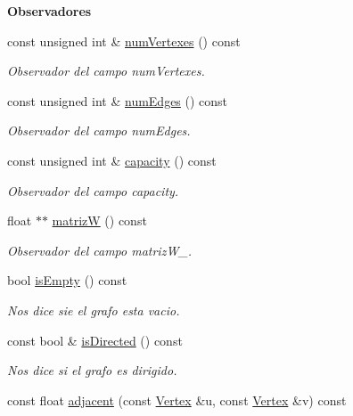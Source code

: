 \begin{Indent}{\bf Observadores}\par
\begin{DoxyCompactItemize}
\item 
const unsigned int \& \hyperlink{classedi_1_1GraphMatrix_ada3e3accdfeb7dc48482560cc2842f59}{num\+Vertexes} () const 
\begin{DoxyCompactList}\small\item\em Observador del campo num\+Vertexes. \end{DoxyCompactList}\item 
const unsigned int \& \hyperlink{classedi_1_1GraphMatrix_a4f5efb372ff3e02a42f2b77ba2932b04}{num\+Edges} () const 
\begin{DoxyCompactList}\small\item\em Observador del campo num\+Edges. \end{DoxyCompactList}\item 
const unsigned int \& \hyperlink{classedi_1_1GraphMatrix_afbcaf9d1a05c4ae921325641148c0a63}{capacity} () const 
\begin{DoxyCompactList}\small\item\em Observador del campo capacity. \end{DoxyCompactList}\item 
float $\ast$$\ast$ \hyperlink{classedi_1_1GraphMatrix_a93459a3fa6e67b66391036d6f608e5c9}{matriz\+W} () const 
\begin{DoxyCompactList}\small\item\em Observador del campo matriz\+W\+\_\+. \end{DoxyCompactList}\item 
bool \hyperlink{classedi_1_1GraphMatrix_aada33cb444bf07048b782c0ed3915600}{is\+Empty} () const 
\begin{DoxyCompactList}\small\item\em Nos dice sie el grafo esta vacio. \end{DoxyCompactList}\item 
const bool \& \hyperlink{classedi_1_1GraphMatrix_ac9ecf45464596cc29ee2e70ce8342c4c}{is\+Directed} () const 
\begin{DoxyCompactList}\small\item\em Nos dice si el grafo es dirigido. \end{DoxyCompactList}\item 
const float \hyperlink{classedi_1_1GraphMatrix_a0e26027ed3a86fa2ec48b1be7f67d4a3}{adjacent} (const \hyperlink{classedi_1_1Vertex}{Vertex} \&u, const \hyperlink{classedi_1_1Vertex}{Vertex} \&v) const 
$$
\end{DoxyCompactItemize}
\end{Indent}
